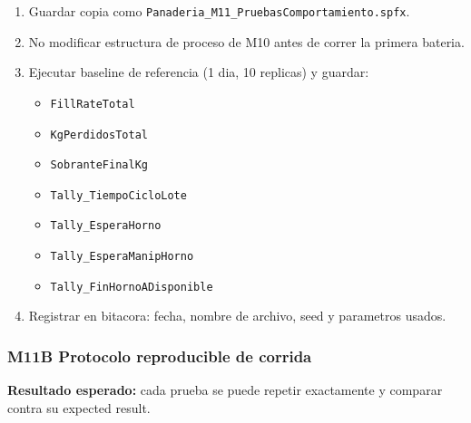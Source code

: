 \documentclass[11pt]{article}
\newcommand{\simio}[1]{\texttt{#1}}
\newcommand{\resp}[1]{\texttt{#1}}
\begin{document}
\begin{enumerate}
  \item Guardar copia como \simio{Panaderia\_M11\_PruebasComportamiento.spfx}.
  \item No modificar estructura de proceso de M10 antes de correr la primera bateria.
  \item Ejecutar baseline de referencia (1 dia, 10 replicas) y guardar:
  \begin{itemize}
    \item \resp{FillRateTotal}
    \item \resp{KgPerdidosTotal}
    \item \resp{SobranteFinalKg}
    \item \simio{Tally\_TiempoCicloLote}
    \item \simio{Tally\_EsperaHorno}
    \item \simio{Tally\_EsperaManipHorno}
    \item \simio{Tally\_FinHornoADisponible}
  \end{itemize}
  \item Registrar en bitacora: fecha, nombre de archivo, seed y parametros usados.
\end{enumerate}

\subsubsection{M11B Protocolo reproducible de corrida}
\textbf{Resultado esperado:} cada prueba se puede repetir exactamente y comparar contra su expected result.
\end{document}
